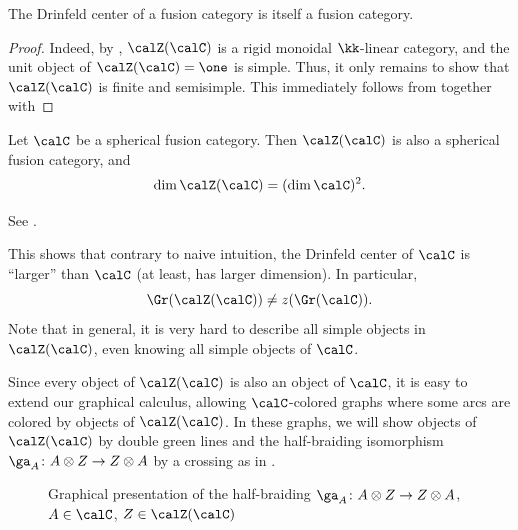 \begin{theorem}\label{t:drinfeld-fusion}
  The Drinfeld center of a fusion category is itself a fusion category.
\end{theorem}
\begin{proof}
  Indeed, by , $\calZ(\calC)$ is a rigid monoidal
  $\kk$-linear  category, and the  unit object of $\calZ(\calC)=\one$ is
  simple. Thus, it only remains to show that $\calZ(\calC)$ is finite and
  semisimple. This  immediately follows from  together
  with 
\end{proof}

\begin{theorem}\label{t:drinfeld-dim}
  Let $\calC$ be a spherical fusion category. Then $\calZ(\calC)$ is also a
  spherical fusion category, and
  $$
    \dim \calZ(\calC) = (\dim \calC)^2.
  $$
\end{theorem}
See \cite[Proposition 9.3.4]{etingof-fusion}.
\begin{remark}\label{r:drinfeld-size}
  This shows that contrary to naive intuition, the Drinfeld center  of $\calC$
  is ``larger'' than $\calC$ (at least, has larger dimension). In particular,
  $$
  \Gr(\calZ(\calC))\ne z(\Gr(\calC)).
  $$
   Note that in general, it is very hard to describe all simple objects in
   $\calZ(\calC)$, even knowing all simple objects of $\calC$.
\end{remark}

Since every object of $\calZ(\calC)$ is also an object of $\calC$, it is easy
to extend our graphical calculus, allowing $\calC$-colored graphs where some
arcs are colored by objects of $\calZ(\calC)$. In these graphs, we
will show objects of $\calZ(\calC)$ by double green lines and the
half-braiding isomorphism $\ga_A\colon A\otimes Z\to Z\otimes A$ by a
crossing as in .
\begin{figure}[ht]

  \caption{Graphical presentation of the half-braiding
    $\ga_A\colon A\otimes Z\to Z\otimes A$,
    $A\in \calC$, $Z\in \calZ(\calC)$ }\label{f:crossing}
\end{figure}



